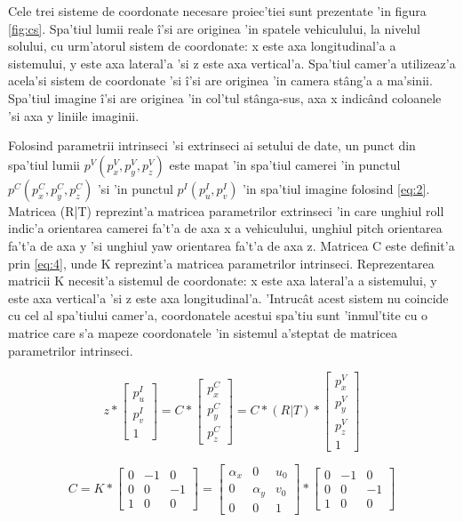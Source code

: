 \documentclass[12pt,a4paper,twoside]{report}
\begin{document}
Cele trei sisteme de coordonate necesare proiec'tiei sunt prezentate 'in figura \ref{fig:cs}. Spa'tiul lumii reale \^i'si are originea 'in spatele vehiculului, la nivelul solului, cu urm'atorul sistem de coordonate: x este axa longitudinal'a a sistemului, y este axa lateral'a 'si z este axa vertical'a. Spa'tiul camer'a utilizeaz'a acela'si sistem de coordonate 'si \^i'si are originea 'in camera st\^ang'a a ma'sinii.  Spa'tiul imagine \^i'si are originea 'in col'tul st\^anga-sus, axa x indic\^and coloanele 'si axa y liniile imaginii.

Folosind parametrii intrinseci 'si extrinseci ai setului de date, un punct din spa'tiul lumii $p^V(p_x^V, p_y^V, p_z^V)$ este mapat 'in spa'tiul camerei 'in punctul $p^C(p_x^C, p_y^C, p_z^C)$ 'si 'in punctul $p^I(p_u^I, p_v^I)$ 'in spa'tiul imagine folosind \ref{eq:2}. Matricea (R|T) reprezint'a matricea parametrilor extrinseci 'in care unghiul roll indic'a orientarea camerei fa't'a de axa x a vehiculului, unghiul pitch orientarea fa't'a de axa y 'si unghiul yaw orientarea fa't'a de axa z. Matricea C este definit'a prin \ref{eq:4}, unde K reprezint'a matricea parametrilor intrinseci. Reprezentarea matricii K necesit'a sistemul de coordonate: x este axa lateral'a a sistemului, y este axa vertical'a 'si z este axa longitudinal'a. 'Intruc\^at acest sistem nu coincide cu cel al spa'tiului camer'a, coordonatele acestui spa'tiu sunt 'inmul'tite cu o matrice care s'a mapeze coordonatele 'in sistemul a'steptat de matricea parametrilor intrinseci.

\begin{equation}
z * \begin{bmatrix}
	p_u^I \\
	p_v^I \\
	1
	\end{bmatrix}
= C * \begin{bmatrix}
	p_x^C \\
	p_y^C \\
	p_z^C
	\end{bmatrix} =
C * (R|T) *\begin{bmatrix}
	p_x^V \\
	p_y^V \\
	p_z^V \\
	1
\end{bmatrix}
\label{eq:2}
\end{equation}


\begin{equation}
C
= K * \begin{bmatrix}
	0 & -1 & 0\\
	0 & 0 & -1\\
	1 & 0 & 0
	\end{bmatrix}
= \begin{bmatrix}
	\alpha_x & 0 & u_0 \\
	0 & \alpha_y & v_0\\
	0 & 0 & 1
	\end{bmatrix}
	* \begin{bmatrix}
	0 & -1 & 0\\
	0 & 0 & -1\\
	1 & 0 & 0
	\end{bmatrix}
\label{eq:4}
\end{equation}
\end{document}
